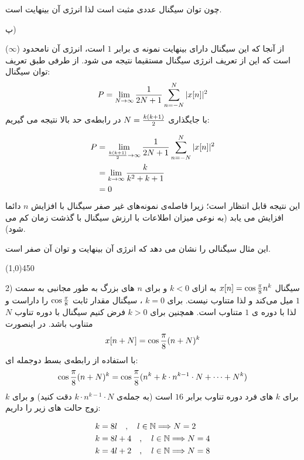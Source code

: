\documentclass[50pt]{article}
\newcommand{\hl}{
\begin{center}
\line(1,0){450}
\end{center}}
\begin{document}
\begin{RTL}
{چون توان سیگنال عددی مثبت است لذا انرژی آن بینهایت است.


پ)
 
از آنجا که این سیگنال دارای بینهایت نمونه ی برابر $1$ است، انرژی آن نامحدود ($\infty$) است که این از تعریف انرژی سیگنال مستقیما نتیجه می شود. از طرفی طبق تعریف توان سیگنال:
\[
\begin{split}
P&=\lim_{N\to \infty}{1\over 2N+1}\sum_{n=-N}^{N}|x[n]|^2\\
\end{split}
\]
با جایگذاری 
$N={k(k+1)\over 2}$
در رابطه‌ی حد بالا نتیجه می گیریم:

\[
\begin{split}
P&=\lim_{{k(k+1)\over 2}\to \infty}{1\over 2N+1}\sum_{n=-N}^{N}|x[n]|^2\\&=\lim_{k\to \infty}{k\over k^2+k+1}\\&=0
\end{split}
\]
 این نتیجه قابل انتظار است؛ زیرا فاصله‌ی نمونه‌های غیر صفر سیگنال با افزایش $n$ دائما افزایش می یابد (به نوعی میزان اطلاعات با ارزش سیگنال با گذشت زمان کم می شود).

این مثال سیگنالی را نشان می دهد که انرژی آن بینهایت و توان آن صفر است.



\hl
2) سیگنال 
$x[n]=\cos {\pi \over 8} n^k$
  به ازای $k<0$ و برای $n$ های بزرگ به طور مجانبی به سمت $1$ میل می‌کند و لذا متناوب نیست. برای $k=0$ ،  سیگنال مقدار ثابت  $\cos{\pi\over 8}$ را داراست و لذا با دوره ی $1 $ متناوب است. همچنین برای $k>0$ فرض کنیم سیگنال با دوره تناوب $N$ متناوب باشد. در اینصورت 
\[
x[n+N]=\cos{\pi \over 8}(n+N)^k
\]
با استفاده از رابطه‌ی بسط دوجمله ای:
\[
\cos{\pi \over 8}(n+N)^k=\cos{\pi \over 8}(n^k+k\cdot n^{k-1}\cdot N+\cdots +N^k)
\]
برای $k$ های فرد دوره تناوب برابر $16$ است (به جمله‌ی $k\cdot n^{k-1}\cdot N$ دقت کنید) و برای $k$ زوج حالت های زیر را داریم:

\[
\begin{split}
&k=8l\quad,\quad l\in\Bbb N\Longrightarrow N=2\\&
k=8l+4\quad,\quad l\in\Bbb N\Longrightarrow N=4\\&
k=4l+2\quad,\quad l\in\Bbb N\Longrightarrow N=8\\
\end{split}
\]

















}





\end{RTL}
\end{document}
